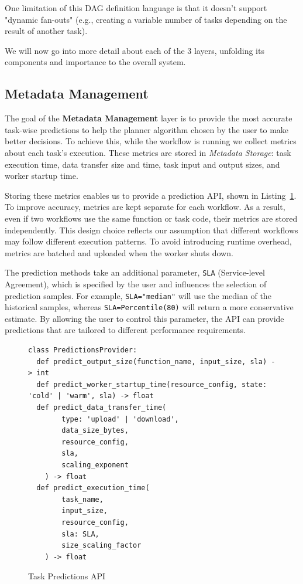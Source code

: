 \documentclass[conference]{IEEEtran}
\begin{document}
One limitation of this DAG definition language is that it doesn't support "dynamic fan-outs" (e.g., creating a variable number of tasks depending on the result of another task). 

We will now go into more detail about each of the 3 layers, unfolding its components and importance to the overall system.

\subsection{Metadata Management}
\label{ss:metadata_management}
The goal of the \textbf{Metadata Management} layer is to provide the most accurate task-wise predictions to help the planner algorithm chosen by the user to make better decisions. To achieve this, while the workflow is running we collect metrics about each task's execution. These metrics are stored in \textit{Metadata Storage}: task execution time, data transfer size and time, task input and output sizes, and worker startup time. 

Storing these metrics enables us to provide a prediction API, shown in Listing~\ref{lst:task_predictions_api}. To improve accuracy, metrics are kept separate for each workflow. As a result, even if two workflows use the same function or task code, their metrics are stored independently. This design choice reflects our assumption that different workflows may follow different execution patterns. To avoid introducing runtime overhead, metrics are batched and uploaded when the worker shuts down.

The prediction methods take an additional parameter, \texttt{SLA} (Service-level Agreement), which is specified by the user and influences the selection of prediction samples. For example, \texttt{SLA="median"} will use the median of the historical samples, whereas \texttt{SLA=Percentile(80)} will return a more conservative estimate. By allowing the user to control this parameter, the API can provide predictions that are tailored to different performance requirements.

\begin{figure}[h]
\centering
\begin{lstlisting}[basicstyle=\ttfamily\footnotesize, columns=fullflexible, breaklines=true]
class PredictionsProvider:
  def predict_output_size(function_name, input_size, sla) -> int
  def predict_worker_startup_time(resource_config, state: 'cold' | 'warm', sla) -> float
  def predict_data_transfer_time(
        type: 'upload' | 'download',
        data_size_bytes,
        resource_config,
        sla,
        scaling_exponent
    ) -> float
  def predict_execution_time(
        task_name,
        input_size,
        resource_config,
        sla: SLA,
        size_scaling_factor
    ) -> float
\end{lstlisting}
\caption{Task Predictions API}
\label{lst:task_predictions_api}
\end{figure}
\end{document}
